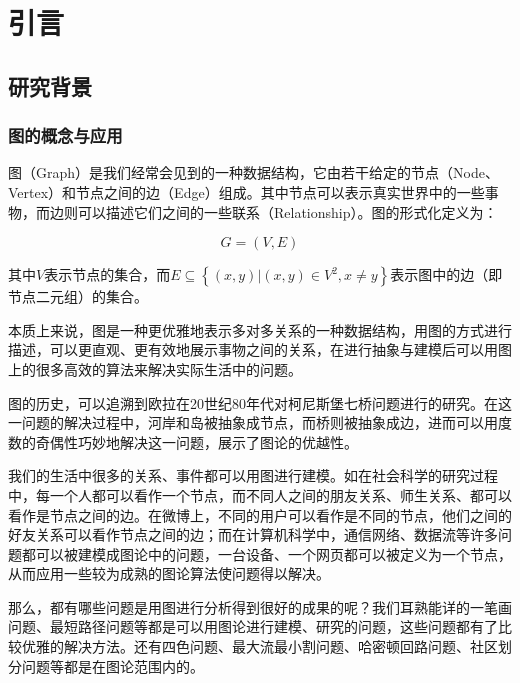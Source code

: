 
\chapter{引言}
\label{cha:intro}

\section{研究背景}

\subsection{图的概念与应用}

图（Graph）是我们经常会见到的一种数据结构，它由若干给定的节点（Node、Vertex）和节点之间的边（Edge）组成。其中节点可以表示真实世界中的一些事物，而边则可以描述它们之间的一些联系（Relationship）。图的形式化定义为：

\vspace{-8mm}

\begin{equation}
G=(V,E)
\end{equation}

\noindent 其中$V$表示节点的集合，而$E \subseteq\left\{(x, y)|(x, y) \in V^{2}, x \neq y\right\}$表示图中的边（即节点二元组）的集合。

本质上来说，图是一种更优雅地表示多对多关系的一种数据结构，用图的方式进行描述，可以更直观、更有效地展示事物之间的关系，在进行抽象与建模后可以用图上的很多高效的算法来解决实际生活中的问题。

图的历史，可以追溯到欧拉在20世纪80年代对柯尼斯堡七桥问题\cite{biggs1986graph}进行的研究。在这一问题的解决过程中，河岸和岛被抽象成节点，而桥则被抽象成边，进而可以用度数的奇偶性巧妙地解决这一问题，展示了图论的优越性。

我们的生活中很多的关系、事件都可以用图进行建模。如在社会科学的研究过程中，每一个人都可以看作一个节点，而不同人之间的朋友关系、师生关系、都可以看作是节点之间的边。在微博上，不同的用户可以看作是不同的节点，他们之间的好友关系可以看作节点之间的边；而在计算机科学中，通信网络、数据流等许多问题都可以被建模成图论中的问题，一台设备、一个网页都可以被定义为一个节点，从而应用一些较为成熟的图论算法使问题得以解决。

那么，都有哪些问题是用图进行分析得到很好的成果的呢？我们耳熟能详的一笔画问题、最短路径问题等都是可以用图论进行建模、研究的问题，这些问题都有了比较优雅的解决方法。还有四色问题、最大流最小割问题、哈密顿回路问题、社区划分问题等都是在图论范围内的。

